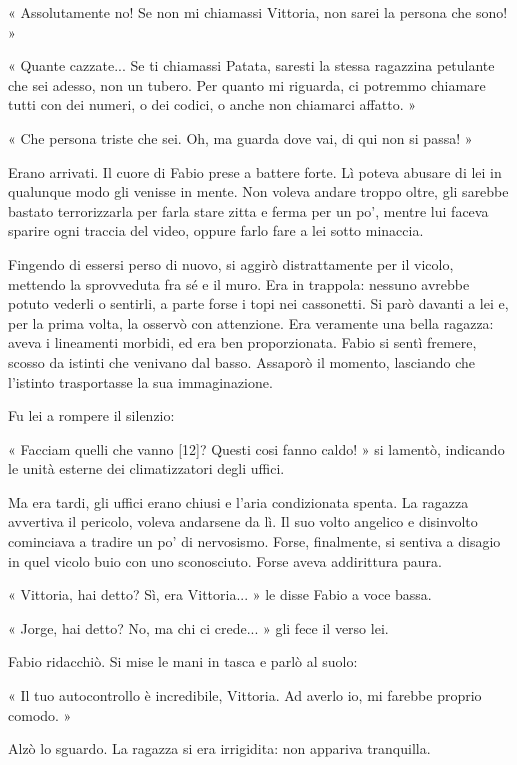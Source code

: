 « Assolutamente no! Se non mi chiamassi Vittoria, non sarei la persona che sono! »

« Quante cazzate... Se ti chiamassi Patata, saresti la stessa ragazzina petulante che sei adesso, non un tubero. Per quanto mi riguarda, ci potremmo chiamare tutti con dei numeri, o dei codici, o anche non chiamarci affatto. »

« Che persona triste che sei. Oh, ma guarda dove vai, di qui non si passa! »

Erano arrivati. Il cuore di Fabio prese a battere forte. Lì poteva abusare di lei in qualunque modo gli venisse in mente. Non voleva andare troppo oltre, gli sarebbe bastato terrorizzarla per farla stare zitta e ferma per un po', mentre lui faceva sparire ogni traccia del video, oppure farlo fare a lei sotto minaccia.

Fingendo di essersi perso di nuovo, si aggirò distrattamente per il vicolo, mettendo la sprovveduta fra sé e il muro. Era in trappola: nessuno avrebbe potuto vederli o sentirli, a parte forse i topi nei cassonetti. Si parò davanti a lei e, per la prima volta, la osservò con attenzione. Era veramente una bella ragazza: aveva i lineamenti morbidi, ed era ben proporzionata. Fabio si sentì fremere, scosso da istinti che venivano dal basso. Assaporò il momento, lasciando che l'istinto trasportasse la sua immaginazione.

Fu lei a rompere il silenzio:

« Facciam quelli che vanno [12]? Questi cosi fanno caldo! » si lamentò, indicando le unità esterne dei climatizzatori degli uffici.

Ma era tardi, gli uffici erano chiusi e l'aria condizionata spenta. La ragazza avvertiva il pericolo, voleva andarsene da lì. Il suo volto angelico e disinvolto cominciava a tradire un po' di nervosismo. Forse, finalmente, si sentiva a disagio in quel vicolo buio con uno sconosciuto. Forse aveva addirittura paura.

« Vittoria, hai detto? Sì, era Vittoria... » le disse Fabio a voce bassa.

« Jorge, hai detto? No, ma chi ci crede... » gli fece il verso lei.

Fabio ridacchiò. Si mise le mani in tasca e parlò al suolo:

« Il tuo autocontrollo è incredibile, Vittoria. Ad averlo io, mi farebbe proprio comodo. »

Alzò lo sguardo. La ragazza si era irrigidita: non appariva tranquilla.

